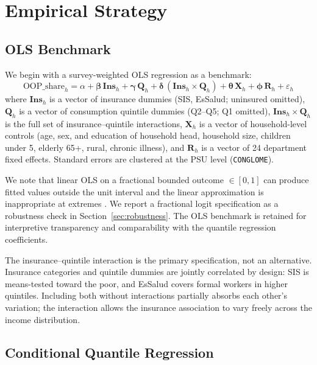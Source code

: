 \section{Empirical Strategy}\label{sec:strategy}

\subsection{OLS Benchmark}

We begin with a survey-weighted OLS regression as a benchmark:
\begin{equation}\label{eq:ols}
    \text{OOP\_share}_h = \alpha + \boldsymbol{\beta} \, \mathbf{Ins}_h + \boldsymbol{\gamma} \, \mathbf{Q}_h + \boldsymbol{\delta} \, (\mathbf{Ins}_h \times \mathbf{Q}_h) + \boldsymbol{\theta} \, \mathbf{X}_h + \boldsymbol{\phi} \, \mathbf{R}_h + \varepsilon_h
\end{equation}
where $\mathbf{Ins}_h$ is a vector of insurance dummies (SIS, EsSalud; uninsured omitted), $\mathbf{Q}_h$ is a vector of consumption quintile dummies (Q2--Q5; Q1 omitted), $\mathbf{Ins}_h \times \mathbf{Q}_h$ is the full set of insurance--quintile interactions, $\mathbf{X}_h$ is a vector of household-level controls (age, sex, and education of household head, household size, children under 5, elderly 65+, rural, chronic illness), and $\mathbf{R}_h$ is a vector of 24 department fixed effects. Standard errors are clustered at the PSU level (\texttt{CONGLOME}).

We note that linear OLS on a fractional bounded outcome $\in [0,1]$ can produce fitted values outside the unit interval and the linear approximation is inappropriate at extremes \citep{Papke1996}. We report a fractional logit specification as a robustness check in Section~\ref{sec:robustness}. The OLS benchmark is retained for interpretive transparency and comparability with the quantile regression coefficients.

The insurance--quintile interaction is the primary specification, not an alternative. Insurance categories and quintile dummies are jointly correlated by design: SIS is means-tested toward the poor, and EsSalud covers formal workers in higher quintiles. Including both without interactions partially absorbs each other's variation; the interaction allows the insurance association to vary freely across the income distribution.

\subsection{Conditional Quantile Regression}

